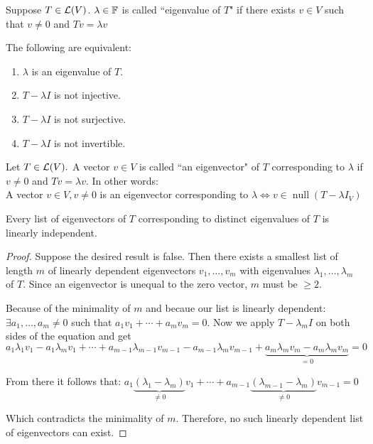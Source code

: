 \begin{mydef}
    Suppose $T\in \mathcal{L} (V)$. $\lambda \in {\mathbb{F}}$ is called ``eigenvalue of $T$" if there exists $v \in V$ such that $v \neq 0$ and $Tv = \lambda v$
\end{mydef}

\setcounter{thm}{6}
\begin{thm}
    The following are equivalent:
    \begin{enumerate}[label=(\alph*)]
        \item $\lambda$ is an eigenvalue of $T$.
        \item $T-\lambda I$ is not injective.
        \item $T-\lambda I$ is not surjective.
        \item $T-\lambda I$ is not invertible.
    \end{enumerate}
\end{thm}

\setcounter{thm}{7}
\begin{thm}
    Let $T\in \mathcal{L}(V).$ A vector $v \in V$ is called ``an eigenvector" of $T$ corresponding to $\lambda$ if $v\neq 0$ and $Tv = \lambda v$.
    In other words: 
    \\A vector $v\in V, v \neq 0$ is an eigenvector corresponding to $\lambda \iff v \in \operatorname{null}(T-\lambda I_V)$
\end{thm}

\setcounter{thm}{10}
\begin{thm}
    Every list of eigenvectors of $T$ corresponding to distinct eigenvalues of $T$ is linearly independent.
\end{thm}
\begin{proof}
    Suppose the desired result is false. Then there exists a smallest list of length $m$ of linearly dependent eigenvectors $v_1, \dots, v_m$ with eigenvalues $\lambda_1, \dots, \lambda_m$ of $T$. Since an eigenvector is unequal to the zero vector, $m$ must be $\geq 2$.
    
    Because of the minimality of $m$ and becaue our list is linearly dependent: $\exists a_1, \dots, a_m \neq 0$ such that $a_1 v_1 + \cdots + a_m v_m = 0$. Now we apply $T-\lambda_m I$ on both sides of the equation and get  
    $a_1 \lambda_1 v_1 - a_1 \lambda_m v_1 + \cdots +
    a_{m-1} \lambda_{m-1} v_{m-1} - a_{m-1} \lambda_{m} v_{m-1} +
    \underbrace{a_m \lambda_m v_m -a_m \lambda_m v_m}_{=0}=0$
   
    From there it follows that:
   $a_1 \underbrace{(\lambda_1 - \lambda_m)}_{\neq 0} v_1 + \cdots + a_{m-1} \underbrace{(\lambda_{m-1}-\lambda_{m})}_{\neq 0} v_{m-1}=0$
   
   Which contradicts the minimality of $m$. Therefore, no such linearly dependent list of eigenvectors can exist.
\end{proof}

